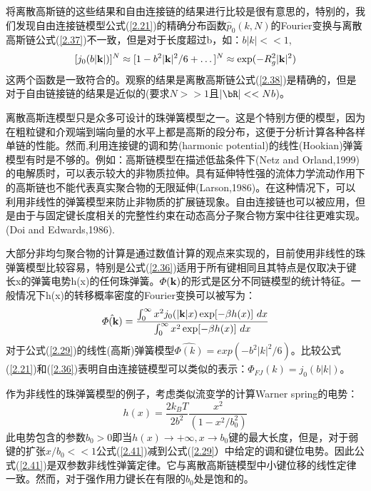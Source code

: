 将离散高斯链的这些结果和自由连接链的结果进行比较是很有意思的，特别的，我们发现自由连接链模型公式(\ref{2.21})的精确分布函数$\hat{p}_{0}(k,N)$的Fourier变换与离散高斯链公式(\ref{2.37})不一致，但是对于长度超过b，如：$b|k|<<1$,
\begin{equation}\label{2.39}
[j_{0}(b|\mathbf{k}|)]^N\approx [1-b^2|\mathbf{k}|^2/6+\dots]^N\approx \exp(-R_{g}^2|\mathbf{k}|^2)
\end{equation}
这两个函数是一致符合的。观察的结果是离散高斯链公式(\ref{2.38})是精确的，但是对于自由链接链的结果是近似的(要求$N>>1$且$|\bR|<<Nb$)。

离散高斯连模型只是众多可设计的珠弹簧模型之一。这是个特别方便的模型，因为在粗粒键和介观端到端向量的水平上都是高斯的段分布，这便于分析计算各种各样单链的性能。然而,利用连接键的调和势(harmonic potential)的线性(Hookian)弹簧模型有时是不够的。例如：高斯链模型在描述低盐条件下(Netz and Orland,1999)的电解质时，可以表示较大的非物质拉伸。具有延伸特性强的流体力学流动作用下的高斯链也不能代表真实聚合物的无限延伸(Larson,1986)。在这种情况下，可以利用非线性的弹簧模型来防止非物质的扩展链现象。自由连接链也可以被应用，但是由于与固定键长度相关的完整性约束在动态高分子聚合物方案中往往更难实现。(Doi and Edwards,1986).

大部分非均匀聚合物的计算是通过数值计算的观点来实现的，目前使用非线性的珠弹簧模型比较容易，特别是公式(\ref{2.36})适用于所有键相同且其特点是仅取决于键长x的弹簧电势h(x)的任何珠弹簧。$\varPhi(\mathbf{k})$的形式是区分不同链模型的统计特征。一般情况下h(x)的转移概率密度的Fourier变换可以被写为：
\begin{equation}\label{2.40}
\hat{\varPhi(\mathbf{k})}=\frac{\int_{0}^{\infty}  x^2j_{0}(|\mathbf{k}|x)\exp[-\beta h(x)]~dx}{\int_{0}^{\infty}  x^2\exp[-\beta h(x)]~dx} 
\end{equation}
对于公式(\ref{2.29})的线性(高斯)弹簧模型$\hat{\varPhi(k)}=exp(-b^2|k|^2/6)$。比较公式(\ref{2.21})和(\ref{2.36})表明自由连接链模型可以类似的表示：$\hat{\varPhi_{FJ}(k)}=j_{0}(b|k|)$。

作为非线性的珠弹簧模型的例子，考虑类似流变学的计算Warner spring的电势：
\begin{equation}\label{2.41}
h(x)=\frac{2k_{B}T}{2b^2}\frac{x^2}{(1-x^2/b_{0}^2)}
\end{equation}
此电势包含的参数$b_{0}>0$即当$h(x)\to +\infty,x\to b_{0}$键的最大长度，但是，对于弱键的扩张$x/b_{0}<<1$公式(\ref{2.41})减到公式(\ref{2.29}）中给定的调和键位电势。因此公式(\ref{2.41})是双参数非线性弹簧定律。它与离散高斯链模型中小键位移的线性定律一致。然而，对于强作用力键长在有限的$b_{0}$处是饱和的。

